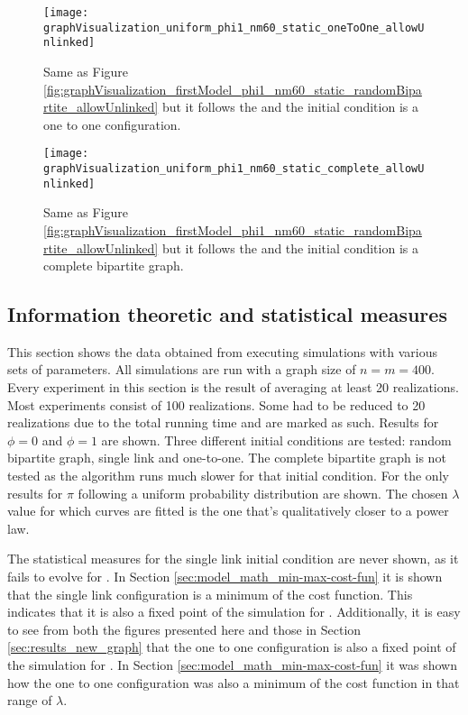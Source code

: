\begin{figure}
  \centering
  \texttt{[image: graphVisualization\_uniform\_phi1\_nm60\_static\_oneToOne\_allowUnlinked]}
  \caption{Same as Figure \ref{fig:graphVisualization_firstModel_phi1_nm60_static_randomBipartite_allowUnlinked} but it follows the \secondmodel{} and the initial condition is a one to one configuration.}
  \label{fig:graphVisualization_uniform_phi1_nm60_static_oneToOne_allowUnlinked}
\end{figure}

\begin{figure}
  \centering
  \texttt{[image: graphVisualization\_uniform\_phi1\_nm60\_static\_complete\_allowUnlinked]}
  \caption{Same as Figure \ref{fig:graphVisualization_firstModel_phi1_nm60_static_randomBipartite_allowUnlinked} but it follows the \secondmodel{} and the initial condition is a complete bipartite graph.}
  \label{fig:graphVisualization_uniform_phi1_nm60_static_complete_allowUnlinked}
\end{figure}


\subsection{Information theoretic and statistical measures}
\label{sec:results_new_other}

This section shows the data obtained from executing simulations with various sets of parameters.
All simulations are run with a graph size of $n=m=400$.
Every experiment in this section is the result of averaging at least 20 realizations.
Most experiments consist of 100 realizations.
Some had to be reduced to 20 realizations due to the total running time and are marked as such.
Results for $\phi=0$ and $\phi=1$ are shown.
Three different initial conditions are tested: random bipartite graph, single link and one-to-one.
The complete bipartite graph is not tested as the algorithm runs much slower for that initial condition.
For the \secondmodel{} only results for $\pi$ following a uniform probability distribution are shown.
The chosen $\lambda$ value for which curves are fitted is the one that's qualitatively closer to a power law.

The statistical measures for the single link initial condition are never shown, as it fails to evolve for \lambdaZeroToHalf{}.
In Section \ref{sec:model_math_min-max-cost-fun} it is shown that the single link configuration is a minimum of the cost function.
This indicates that it is also a fixed point of the simulation for \lambdaZeroToHalf{}.
Additionally, it is easy to see from both the figures presented here and those in Section \ref{sec:results_new_graph} that the one to one configuration is also a fixed point of the simulation for \lambdaHalfToOne{}.
In Section \ref{sec:model_math_min-max-cost-fun} it was shown how the one to one configuration was also a minimum of the cost function in that range of $\lambda$.

